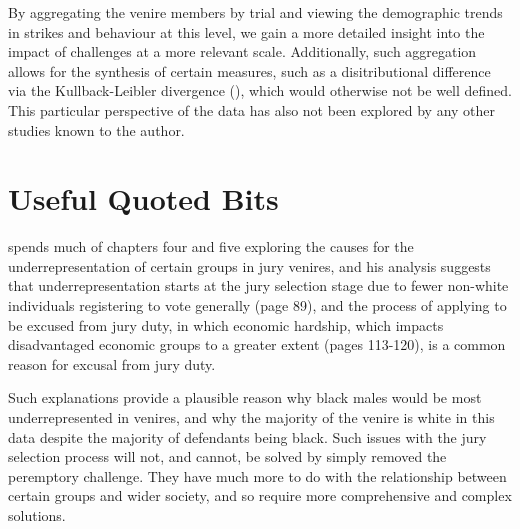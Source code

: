 By aggregating the venire members by trial and viewing the demographic trends in strikes and behaviour at this level, we gain a
more detailed insight into the impact of challenges at a more relevant scale. Additionally, such aggregation allows for the
synthesis of certain measures, such as a disitributional difference via the Kullback-Leibler divergence (\cite{kullback1951}),
which would otherwise not be well defined. This particular perspective of the data has also not been explored by any other studies
known to the author.

\section{Useful Quoted Bits}

\cite{vandykejurysel} spends much of chapters four and five exploring the causes for the underrepresentation of certain groups in
jury venires, and his analysis suggests that underrepresentation starts at the jury selection stage due to fewer non-white
individuals registering to vote generally (page 89), and the process of applying to be excused from jury duty, in which economic
hardship, which impacts disadvantaged economic groups to a greater extent (pages 113-120), is a common reason for excusal from
jury duty.

Such explanations provide a plausible reason why black males would be most underrepresented in venires, and why the majority of
the venire is white in this data despite the majority of defendants being black. Such issues with the jury selection process will
not, and cannot, be solved by simply removed the peremptory challenge. They have much more to do with the relationship between
certain groups and wider society, and so require more comprehensive and complex solutions.